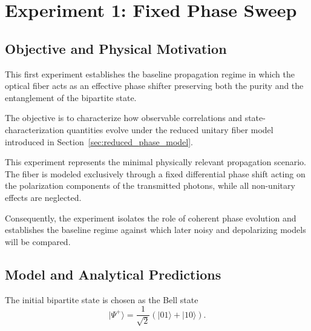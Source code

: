 
\newpage

\section{Experiment 1: Fixed Phase Sweep}
\label{sec:exp_1_fixed_phase_sweep}


\subsection*{Objective and Physical Motivation}

This first experiment establishes the baseline propagation regime in which the optical fiber acts as an effective phase shifter preserving both the purity and the entanglement of the bipartite state.

The objective is to characterize how observable correlations and state-characterization quantities evolve under the reduced unitary fiber model introduced in Section~\ref{sec:reduced_phase_model}.

This experiment represents the minimal physically relevant propagation scenario. The fiber is modeled exclusively through a fixed differential phase shift acting on the polarization components of the transmitted photons, while all non-unitary effects are neglected.

Consequently, the experiment isolates the role of coherent phase evolution and establishes the baseline regime against which later noisy and depolarizing models will be compared.


\subsection*{Model and Analytical Predictions}

The initial bipartite state is chosen as the Bell state
\[
|\Psi^{+}\rangle
=
\frac{1}{\sqrt{2}}
\left(
|01\rangle + |10\rangle
\right).
\]

